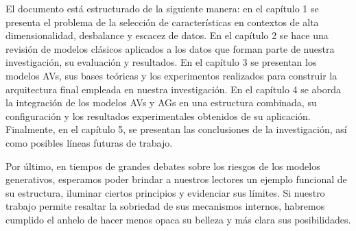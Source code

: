 El documento está estructurado de la siguiente manera: en el capítulo 1 se presenta el problema de la selección de características en contextos de alta dimensionalidad, desbalance y escacez de datos. En el capítulo 2 se hace una revisión de modelos clásicos aplicados a los datos que forman parte de nuestra investigación, su evaluación y resultados. En el capítulo 3 se presentan los modelos AVs, sus bases teóricas y los experimentos realizados para construir la arquitectura final empleada en nuestra investigación. En el capítulo 4 se aborda la integración de los modelos AVs y AGs en una estructura combinada, su configuración y los resultados experimentales obtenidos de su aplicación. Finalmente, en el capítulo 5, se presentan las conclusiones de la investigación, así como posibles líneas futuras de trabajo.

Por último, en tiempos de grandes debates sobre los riesgos de los modelos generativos, esperamos poder brindar a nuestros lectores un ejemplo funcional de su estructura, iluminar ciertos principios y evidenciar sus límites. Si nuestro trabajo permite resaltar la sobriedad de sus mecanismos internos, habremos cumplido el anhelo de hacer menos opaca su belleza y más clara sus posibilidades.